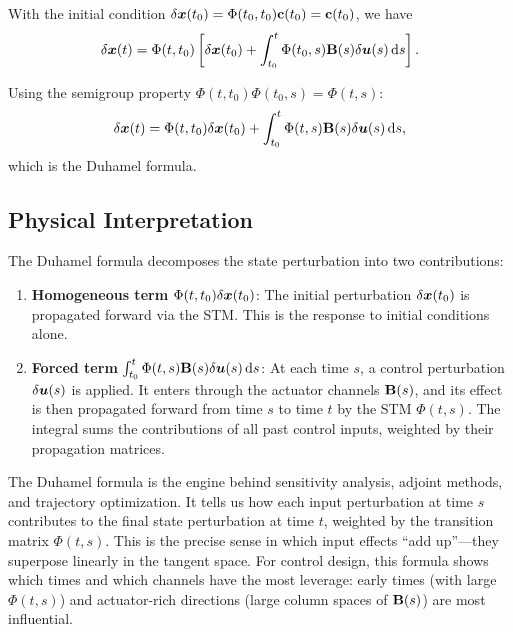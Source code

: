 With the initial condition $\delta\bm{x}(t_0) = \Phi(t_0,t_0)\mathbf{c}(t_0) = \mathbf{c}(t_0)$, we have
\begin{equation}
\delta\bm{x}(t) = \Phi(t,t_0)\left[\delta\bm{x}(t_0) + \int_{t_0}^{t}\Phi(t_0,s)\mathbf{B}(s)\delta\bm{u}(s)\,\mathrm{d} s\right].
\end{equation}

Using the semigroup property $\Phi(t,t_0)\Phi(t_0,s) = \Phi(t,s)$:
\begin{equation}
\delta\bm{x}(t) = \Phi(t,t_0)\delta\bm{x}(t_0) + \int_{t_0}^{t}\Phi(t,s)\mathbf{B}(s)\delta\bm{u}(s)\,\mathrm{d} s,
\end{equation}
which is the Duhamel formula.

\subsection{Physical Interpretation}

The Duhamel formula decomposes the state perturbation into two contributions:

\begin{enumerate}
\item \textbf{Homogeneous term} $\Phi(t,t_0)\delta\bm{x}(t_0)$: The initial perturbation $\delta\bm{x}(t_0)$ is propagated
      forward via the STM. This is the response to initial conditions alone.

\item \textbf{Forced term} $\int_{t_0}^{t}\Phi(t,s)\mathbf{B}(s)\delta\bm{u}(s)\,\mathrm{d} s$: At each time $s$, a control
      perturbation $\delta\bm{u}(s)$ is applied. It enters through the actuator channels $\mathbf{B}(s)$, and its effect
      is then propagated forward from time $s$ to time $t$ by the STM $\Phi(t,s)$. The integral sums the
      contributions of all past control inputs, weighted by their propagation matrices.
\end{enumerate}

\begin{designbox}
The Duhamel formula is the engine behind sensitivity analysis, adjoint methods, and trajectory optimization.
It tells us how each input perturbation at time $s$ contributes to the final state perturbation at time $t$,
weighted by the transition matrix $\Phi(t,s)$. This is the precise sense in which input effects ``add up''---they
superpose linearly in the tangent space. For control design, this formula shows which times and which channels
have the most leverage: early times (with large $\Phi(t,s)$) and actuator-rich directions (large column spaces
of $\mathbf{B}(s)$) are most influential.
\end{designbox}



